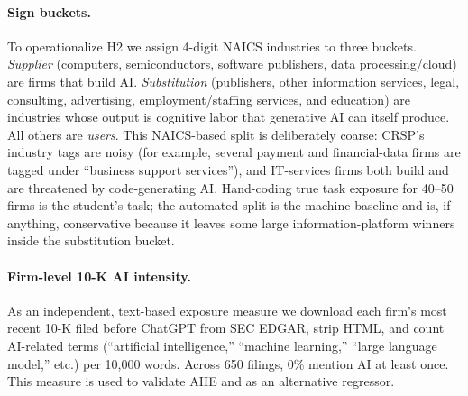 \documentclass[12pt]{article}
\newcommand{\edgarnfirms}{650}\newcommand{\edgarcorr}{0.00}\newcommand{\edgarshare}{0}}
\begin{document}
\paragraph{Sign buckets.} To operationalize H2 we assign 4-digit NAICS industries to
three buckets. \emph{Supplier} (computers, semiconductors, software publishers, data
processing/cloud) are firms that build AI. \emph{Substitution} (publishers, other
information services, legal, consulting, advertising, employment/staffing services, and
education) are industries whose output is cognitive labor that generative AI can itself
produce. All others are \emph{users}. This NAICS-based split is deliberately coarse:
CRSP's industry tags are noisy (for example, several payment and financial-data firms
are tagged under ``business support services''), and IT-services firms both build and
are threatened by code-generating AI. Hand-coding true task exposure for 40--50 firms is
the student's task; the automated split is the machine baseline and is, if anything,
conservative because it leaves some large information-platform winners inside the
substitution bucket.

\paragraph{Firm-level 10-K AI intensity.} As an independent, text-based exposure measure
we download each firm's most recent 10-K filed before ChatGPT from SEC EDGAR, strip HTML,
and count AI-related terms (``artificial intelligence,'' ``machine learning,''
``large language model,'' etc.) per 10{,}000 words. Across \edgarnfirms{} filings,
\edgarshare\% mention AI at least once. This measure is used to validate AIIE and as an
alternative regressor.
\end{document}
